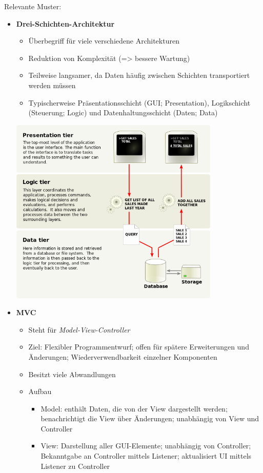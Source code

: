 \documentclass[a4paper, 11pt]{article}
\begin{document}
Relevante Muster:
\begin{itemize}
	\item \textbf{Drei-Schichten-Architektur}
	      \begin{itemize}
		      \item Überbegriff für viele verschiedene Architekturen
		      \item Reduktion von Komplexität (=> bessere Wartung)
		      \item Teilweise langsamer, da Daten häufig zwischen Schichten transportiert werden müssen
		      \item Typischerweise Präsentationsschicht (GUI; Presentation), Logikschicht (Steuerung; Logic) und Datenhaltungsschicht (Daten; Data)
	      \end{itemize}
	      \includegraphics[width=10cm]{threetier}
	\item \textbf{MVC}
	      \begin{itemize}
		      \item Steht für \textit{Model-View-Controller}
		      \item Ziel: Flexibler Programmentwurf; offen für spätere Erweiterungen und Änderungen; Wiederverwendbarkeit einzelner Komponenten
		      \item Besitzt viele Abwandlungen
		      \item Aufbau
		            \begin{itemize}
			            \item Model: enthält Daten, die von der View dargestellt werden; benachrichtigt die View über Änderungen; unabhängig von View und Controller
			            \item View: Darstellung aller GUI-Elemente; unabhängig von Controller; Bekanntgabe an Controller mittels Listener; aktualisiert UI mittels Listener zu Controller

\end{itemize}
\end{itemize}
\end{itemize}
\end{document}
